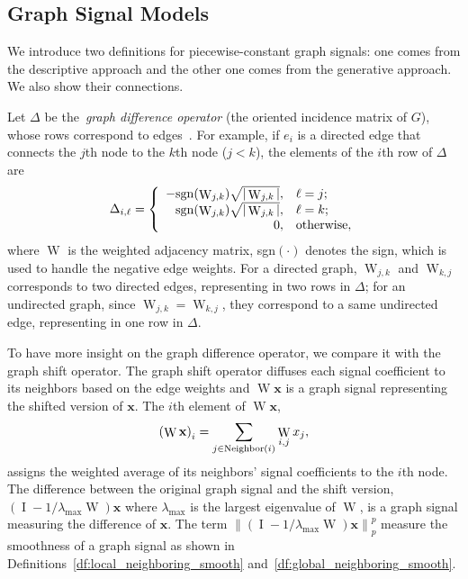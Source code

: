 \documentclass[journal,twocolumn,10pt]{IEEEtran}
\theoremstyle{definition}
\DeclareMathOperator{\Id}{I}
\def\x{\mathbf{x}}
\DeclareMathOperator{\W}{W}
\begin{document}
\subsection{Graph Signal Models}
We introduce two definitions for piecewise-constant  graph signals: one comes from the descriptive approach and the other one comes from the generative approach. We also show their connections.


Let $\Delta$ be the~\emph{graph difference
  operator} (the oriented incidence matrix of $G$), whose rows
correspond to edges~\cite{SharpnackRS:12, WangSST:15}. For example, if
$e_i$ is a directed edge that connects the $j$th node to the $k$th
node ($j < k$), the elements of the $i$th row of $\Delta$ are
\begin{equation*}
\label{eq:Delta}
 \Delta_{i, \ell} = 
  \left\{ 
    \begin{array}{rl}
      - {\rm sgn}(\W_{j,k}) \sqrt{ | \W_{j,k} | }, & \ell = j;\\
       {\rm sgn}(\W_{j,k}) \sqrt{ | \W_{j,k} | }, & \ell = k;\\
      0, & \mbox{otherwise},
  \end{array} \right.
\end{equation*}
where $\W$ is the weighted adjacency matrix, sgn$(\cdot)$ denotes the sign, which is used to handle the negative edge weights. For a directed graph, $\W_{j,k}$ and $\W_{k,j}$ corresponds to two directed edges, representing in two rows in $\Delta$; for an undirected graph, since $\W_{j,k} = \W_{k,j}$, they correspond to a same undirected edge, representing in one row in $\Delta$.


To have more insight on the graph difference operator, we compare it with the graph shift operator. The graph shift operator diffuses each signal coefficient to its neighbors based on the edge weights and $\W \x$ is a graph signal representing the shifted version of $\x$. The $i$th element of $\W \x$,
$$
\left(  \W \x  \right)_i = \sum_{j \in {\rm Neighbor}(i)} \W_{i,j} x_j,
$$
assigns the weighted average of its neighbors' signal coefficients to the $i$th node. The difference between the original graph signal and the shift version, $\left( \Id - 1/\lambda_{\max} \W \right) \x$ where $\lambda_{\max}$ is the largest eigenvalue of $\W$, is a graph signal measuring the difference of $\x$. The term $\left\| \left( \Id - 1/\lambda_{\max} \W \right) \x \right\|_p^p$ measure the smoothness of a graph signal as shown in Definitions~\ref{df:local_neighboring_smooth} and~\ref{df:global_neighboring_smooth}.
\end{document}
